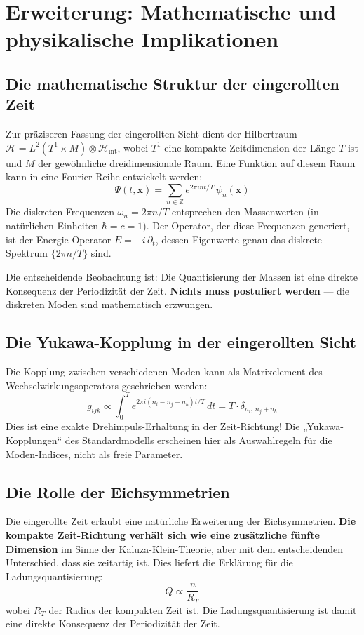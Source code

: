 \section{Erweiterung: Mathematische und physikalische Implikationen}

\subsection{Die mathematische Struktur der eingerollten Zeit}

Zur präziseren Fassung der eingerollten Sicht dient der Hilbertraum $\mathcal{H} = L^2(T^1 \times M) \otimes \mathcal{H}_{\text{int}}$, wobei $T^1$ eine kompakte Zeitdimension der Länge $T$ ist und $M$ der gewöhnliche dreidimensionale Raum. Eine Funktion auf diesem Raum kann in eine Fourier-Reihe entwickelt werden:
\[
 \Psi(t, \mathbf{x}) = \sum_{n \in \mathbb{Z}} e^{2\pi i n t / T}\, \psi_n(\mathbf{x})
\]
Die diskreten Frequenzen $\omega_n = 2\pi n / T$ entsprechen den Massenwerten (in natürlichen Einheiten $\hbar = c = 1$). Der Operator, der diese Frequenzen generiert, ist der Energie-Operator $\hat{E} = -i\,\partial_t$, dessen Eigenwerte genau das diskrete Spektrum $\{2\pi n / T\}$ sind.

Die entscheidende Beobachtung ist: Die Quantisierung der Massen ist eine direkte Konsequenz der Periodizität der Zeit. \textbf{Nichts muss postuliert werden} --- die diskreten Moden sind mathematisch erzwungen.

\subsection{Die Yukawa-Kopplung in der eingerollten Sicht}

Die Kopplung zwischen verschiedenen Moden kann als Matrixelement des Wechselwirkungsoperators geschrieben werden:
\[
 g_{ijk} \propto \int_0^T e^{2\pi i(n_i - n_j - n_k)t/T}\, dt = T \cdot \delta_{n_i,\, n_j + n_k}
\]
Dies ist eine exakte Drehimpuls-Erhaltung in der Zeit-Richtung! Die „Yukawa-Kopplungen`` des Standardmodells erscheinen hier als Auswahlregeln für die Moden-Indices, nicht als freie Parameter.

\subsection{Die Rolle der Eichsymmetrien}

Die eingerollte Zeit erlaubt eine natürliche Erweiterung der Eichsymmetrien. \textbf{Die kompakte Zeit-Richtung verhält sich wie eine zusätzliche fünfte Dimension} im Sinne der Kaluza-Klein-Theorie, aber mit dem entscheidenden Unterschied, dass sie zeitartig ist. Dies liefert die Erklärung für die Ladungsquantisierung:
\[
 Q \propto \frac{n}{R_T}
\]
wobei $R_T$ der Radius der kompakten Zeit ist. Die Ladungsquantisierung ist damit eine direkte Konsequenz der Periodizität der Zeit.

